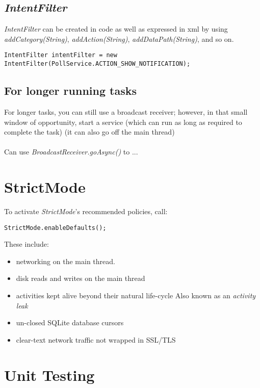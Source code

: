 \documentclass[]{article}
\renewcommand{\it}[1]{\textit{#1}}
\begin{document}
\subsection{\it{IntentFilter}}
\it{IntentFilter} can be created in code as well as expressed in xml by using \it{addCategory(String)}, \it{addAction(String)}, \it{addDataPath(String)}, and so on.
\begin{lstlisting}
IntentFilter intentFilter = new IntentFilter(PollService.ACTION_SHOW_NOTIFICATION);
\end{lstlisting}

\subsection{For longer running tasks}
For longer tasks, you can still use a broadcast receiver; however, in that small window of opportunity, start a service (which can run as long as required to complete the task) (it can also go off the main thread)
\\\\
Can use \it{BroadcastReceiver.goAsync()} to ...

\section{StrictMode}
To activate \it{StrictMode}'s recommended policies, call:
\begin{lstlisting}
StrictMode.enableDefaults();
\end{lstlisting}
These include:
\begin{itemize}
	\item networking on the main thread.
	\item disk reads and writes on the main thread
	\item activities kept alive beyond their natural life-cycle 
	\subitem Also known as an \it{activity leak}
	\item un-closed SQLite database cursors
	\item clear-text network traffic not wrapped in SSL/TLS
\end{itemize}

\section{Unit Testing}
\end{document}

